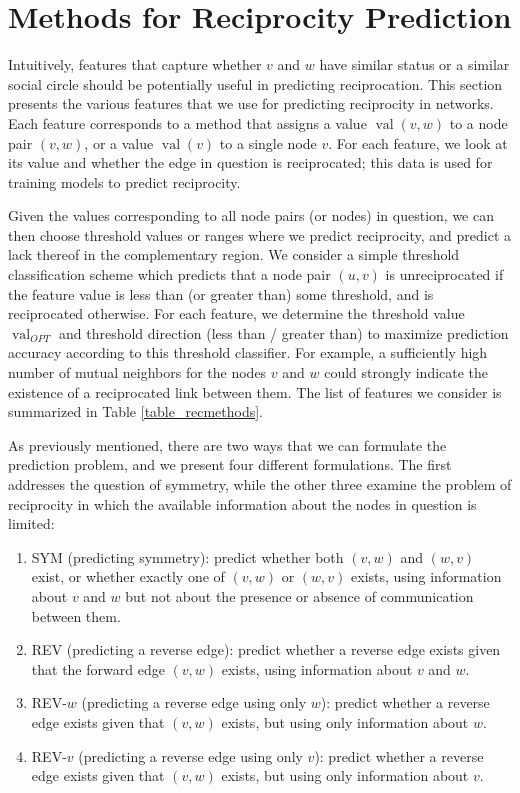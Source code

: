 \documentclass[conference]{IEEEtran}
\begin{document}
\section{Methods for Reciprocity Prediction}
Intuitively, features that capture whether $v$ and $w$ have similar status or a similar social circle should be potentially useful in predicting reciprocation. 
This section presents the various features that we use for predicting reciprocity in networks. 
Each feature corresponds to a method that assigns a value $\operatorname{val}(v,w)$ to a node pair $(v,w)$, or a value $\operatorname{val}(v)$ to a single node $v$. 
For each feature, we look at its value and whether the edge in question is reciprocated; this data is used for training models to predict reciprocity.

Given the values corresponding to all node pairs (or nodes) in question, we can then choose threshold values or ranges where we predict reciprocity, 
and predict a lack thereof in the complementary region.
We consider a simple threshold classification scheme which predicts that a node pair $(u,v)$ is unreciprocated if the feature value is less than (or greater than) some threshold, and is reciprocated otherwise.
For each feature, we determine the threshold value $\operatorname{val}_{OPT}$ and threshold direction (less than / greater than) to maximize prediction accuracy according to this threshold classifier.
For example, a sufficiently high number of mutual neighbors 
for the nodes $v$ and $w$ could strongly indicate the existence of a reciprocated link between them.
The list of features we consider is summarized in Table \ref{table_recmethods}.

As previously mentioned, there are two ways that we can formulate the prediction problem, and we present four different formulations. 
The first addresses the question of symmetry, while the other three examine the problem of reciprocity in which the available information about the nodes in question is limited:

\begin{enumerate}
\item SYM (predicting symmetry): predict whether both $(v,w)$ and $(w,v)$ 
exist, or whether exactly one of $(v,w)$ or $(w,v)$ exists, using
information about $v$ and $w$ but not about the presence or absence of
communication between them.
\item REV (predicting a reverse edge): predict whether a reverse edge exists given that the forward edge $(v,w)$ exists, using information about $v$ and $w$.
\item REV-$w$ (predicting a reverse edge using only $w$): predict whether a reverse edge exists given that $(v,w)$ exists, but using only information about $w$.
\item REV-$v$ (predicting a reverse edge using only $v$): predict whether a reverse edge exists given that $(v,w)$ exists, but using only information about $v$.
\end{enumerate}
\end{document}
